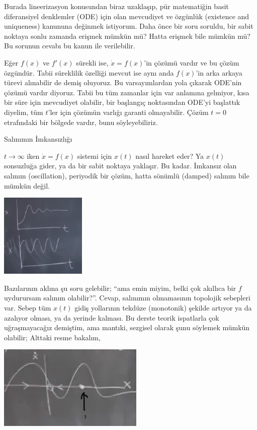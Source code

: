 \documentclass[12pt,fleqn]{article}\usepackage{../../common}
\begin{document}
Burada lineerizasyon konusundan biraz uzaklaşıp, pür matematiğin basit
diferansiyel denklemler (ODE) için olan mevcudiyet ve özgünlük (existence and
uniqueness) kanununa değinmek istiyorum. Daha önce bir soru soruldu, bir sabit
noktaya sonlu zamanda erişmek mümkün mü? Hatta erişmek bile mümkün mü? Bu
sorunun cevabı bu kanun ile verilebilir.

Eğer $f(x)$ ve $f'(x)$ sürekli ise, $\dot{x} = f(x)$'in çözümü vardır ve bu
çözüm özgündür. Tabii süreklilik özelliği mevcut ise aynı anda $f(x)$'in arka
arkaya türevi alınabilir de demiş oluyoruz. Bu varsayımlardan yola çıkarak
ODE'nin çözümü vardır diyoruz. Tabii bu tüm zamanlar için var anlamına gelmiyor,
kısa bir süre için mevcudiyet olabilir, bir başlangıç noktasından ODE'yi
başlattık diyelim, tüm $t$'ler için çözümün varlığı garanti olmayabilir. Çözüm
$t=0$ etrafındaki bir bölgede vardır, bunu söyleyebiliriz. 

Salınımın İmkansızlığı

$t \to \infty$ iken $\dot{x} = f(x)$ sistemi için  $x(t)$ nasıl hareket eder? Ya
$x(t)$ sonsuzluğa gider, ya da bir sabit noktaya yaklaşır. Bu kadar. İmkansız
olan salınım (oscillation), periyodik bir çözüm, hatta sönümlü (damped) salınım
bile mümkün değil. 

\includegraphics[height=4cm]{02_07.png}

Bazılarının aklına şu soru gelebilir; ``ama emin miyim, belki çok akıllıca bir
$f$ uydurursam salınım olabilir?''. Cevap, salınımın olmamasının topolojik
sebepleri var.  Sebep tüm $x(t)$ gidiş yollarının tekdüze (monotonik) şekilde
artıyor ya da azalıyor olması, ya da yerinde kalması. Bu derste teorik
ispatlarla çok uğraşmayacağız demiştim, ama mantıki, sezgisel olarak şunu
söylemek mümkün olabilir; Alttaki resme bakalım,

\includegraphics[height=4cm]{02_08.png}
\end{document}
